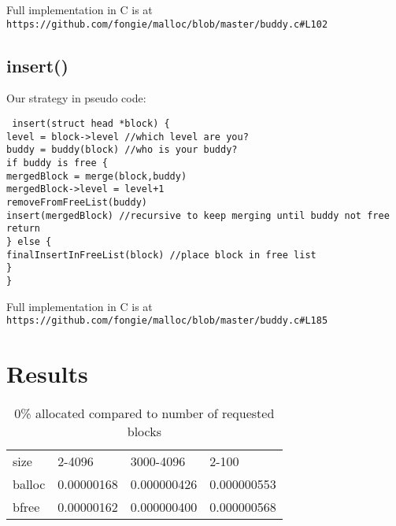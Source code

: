 \documentclass{article}
\def\code#1{\texttt{#1}}
\begin{document}
Full implementation in C is at \code{https://github.com/fongie/malloc/blob/master/buddy.c\#L102}

\subsection{insert()}
Our strategy in pseudo code:

\noindent \code{
	insert(struct head *block) \{ \\
\hspace*{2em}	level = block->level //which level are you? \\
\hspace*{2em}	buddy = buddy(block) //who is your buddy? \\
\hspace*{2em}	if buddy is free \{ \\
\hspace*{4em}		mergedBlock = merge(block,buddy) \\
\hspace*{4em}		mergedBlock->level = level+1 \\
\hspace*{4em}		removeFromFreeList(buddy) \\
\hspace*{4em}		insert(mergedBlock) //recursive to keep merging until buddy not free \\
\hspace*{4em}		return \\
\hspace*{2em}	\} else \{ \\
\hspace*{4em}		finalInsertInFreeList(block) //place block in free list \\
\hspace*{2em}	\} \\
	\}
}

Full implementation in C is at \code{https://github.com/fongie/malloc/blob/master/buddy.c\#L185}
\FloatBarrier
\section{Results}

\begin{table}[]
\caption{0\% allocated compared to number of requested blocks}
\begin{tabular}{llll}
	size         & 2-4096     & 3000-4096   & 2-100         \\
	balloc       & 0.00000168 & 0.000000426 & 0.000000553  \\
	bfree        & 0.00000162 & 0.000000400 & 0.000000568 \\
\end{tabular}
\end{table}
\end{document}
